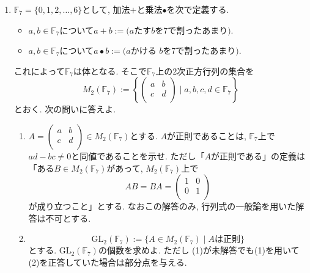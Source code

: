 \documentclass[dvipdfmx,a4paper,11pt]{article}
\theoremstyle{definition}
\begin{document}
\begin{enumerate}[label={\Large \textbf{第}\arabic*\textbf{問}.}]
    
 \item $\mathbb{F}_7=\{0,1 ,2, \ldots, 6\}$として, 
  加法$+ $と乗法$\bullet$を次で定義する.
  \begin{itemize}
  \item $a, b \in \mathbb{F}_7$について$a+b:=\text{($a$たす$b$を$7$で割ったあまり)}$. 
\item $a, b \in \mathbb{F}_7$について$a\bullet b:=\text{($a$かける $b$を$7$で割ったあまり)}$. 
 \end{itemize}
これによって$\mathbb{F}_7$は体となる. そこで$\mathbb{F}_7$上の2次正方行列の集合を
 $$
 M_2(\mathbb{F}_7)
 :=\left\{ \begin{pmatrix}
a & b\\
c & d \\
\end{pmatrix}
\mid a,b,c,d \in \mathbb{F}_7 \right\}
 $$
 とおく. 次の問いに答えよ. 
  \begin{enumerate}[label=(\arabic*)]
 \setlength{\parskip}{0cm} %
  \setlength{\itemsep}{0cm}
  \item $A= \begin{pmatrix}
a & b\\
c & d \\
\end{pmatrix} \in  M_2(\mathbb{F}_7)$とする. $A$が正則であることは, $\mathbb{F}_7$上で$ad-bc \neq 0$と同値であることを示せ. 
  ただし「$A$が正則である」の定義は「ある$B  \in  M_2(\mathbb{F}_7)$があって, $M_2(\mathbb{F}_7)$上で
  $$
  AB=BA=\begin{pmatrix}
1& 0\\
0 & 1 \\
\end{pmatrix}
  $$
  が成り立つこと」とする. なおこの解答のみ, 行列式の一般論を用いた解答は不可とする. 
  \item  
  $$
   \mathrm{GL}_2(\mathbb{F}_7 ):=
   \{A \in  M_2(\mathbb{F}_7) \mid \text{$A$は正則}\}
  $$
  とする. 
  $   \mathrm{GL}_2(\mathbb{F}_7 )$の個数を求めよ. 
ただし (1)が未解答でも(1)を用いて(2)を正答していた場合は部分点を与える. 
  \end{enumerate}
  
 
    

\end{enumerate}
\end{document}
